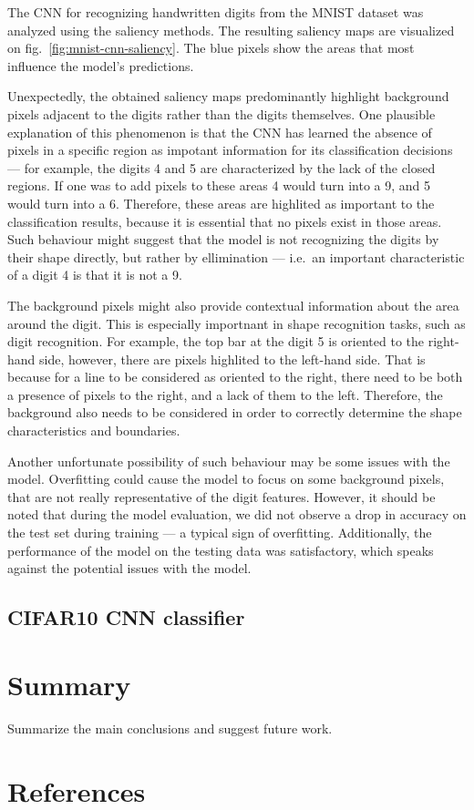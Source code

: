 \documentclass[journal, a4paper]{IEEEtran}
\begin{document}
The CNN for recognizing handwritten digits from the MNIST dataset was analyzed using the saliency methods.
The resulting saliency maps are visualized on fig.~\ref{fig:mnist-cnn-saliency}.
The blue pixels show the areas that most influence the model's predictions.

Unexpectedly, the obtained saliency maps predominantly highlight background pixels adjacent to the digits
rather than the digits themselves.
One plausible explanation of this phenomenon is that the CNN has learned the absence of pixels in a specific region as
impotant information for its classification decisions --- for example, the digits 4 and 5 are characterized by the lack of the closed regions.
If one was to add pixels to these areas 4 would turn into a 9, and 5 would turn into a 6.
Therefore, these areas are highlited as important to the classification results, because it is essential that no pixels exist in those areas.
Such behaviour might suggest that the model is not recognizing the digits by their shape directly, but rather by ellimination --- i.e.\ an important characteristic of a digit 4 is that it is not a 9.

The background pixels might also provide contextual information about the area around the digit.
This is especially importnant in shape recognition tasks, such as digit recognition.
For example, the top bar at the digit 5 is oriented to the right-hand side, however, there are pixels highlited to the left-hand side.
That is because for a line to be considered as oriented to the right, there need to be both a presence of pixels to the right, and a lack of them to the left.
Therefore, the background also needs to be considered in order to correctly determine the shape characteristics and boundaries.

Another unfortunate possibility of such behaviour may be some issues with the model.
Overfitting could cause the model to focus on some background pixels, that are not really representative of the digit features.
However, it should be noted that during the model evaluation, we did not observe a drop in accuracy on the test set during training --- a typical sign of overfitting.
Additionally, the performance of the model on the testing data was satisfactory, which speaks against the potential issues with the model.


\subsection{CIFAR10 CNN classifier}\label{subsec:experiment-cifar}

\section{Summary}\label{sec:summary}
Summarize the main conclusions and suggest future work.

\section{References}\label{sec:references}



\end{document}
